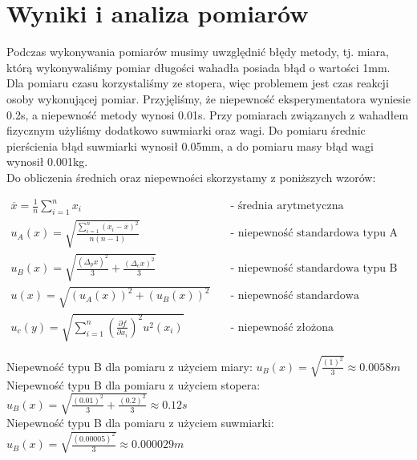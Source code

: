 {\section{Wyniki i analiza pomiarów}}
Podczas wykonywania pomiarów musimy uwzględnić błędy metody,
tj. miara, którą wykonywaliśmy pomiar długości wahadła posiada błąd o wartości 1mm.
Dla pomiaru czasu korzystaliśmy ze stopera, więc problemem jest czas reakcji osoby wykonującej pomiar.
Przyjęliśmy, że niepewność eksperymentatora wyniesie 0.2s, a niepewność metody wynosi 0.01s.
Przy pomiarach związanych z wahadłem fizycznym użyliśmy dodatkowo suwmiarki oraz wagi. Do pomiaru średnic pierścienia błąd suwmiarki wynosił 0.05mm, a do pomiaru masy błąd wagi wynosił 0.001kg. \\
\indent Do obliczenia średnich oraz niepewności skorzystamy z poniższych wzorów: 

\begin{equation*}
    \begin{aligned}
        \displaystyle \overline{x} = \frac{1}{n} \sum_{i=1}^{n} x_i                         \quad &{\textrm{- średnia arytmetyczna}} \\
        u_A(x) = \sqrt{\frac{ \displaystyle \sum_{i=1}^{n}(x_i - \overline{x})^2 }{n(n-1)}} \quad &{\textrm{- niepewność standardowa typu A}} \\
        u_B(x) = \sqrt{ \frac{(\Delta_p x)^2}{3} + \frac{(\Delta_e x)^2}{3} }               \quad &{\textrm{- niepewność standardowa typu B}} \\
        u(x) = \sqrt{ (u_A(x))^2 + (u_B(x))^2 }                                             \quad &{\textrm{- niepewność standardowa całkowita}} \\
        u_c(y) = \sqrt{\displaystyle\sum_{i=1}^{n} \left( \frac{\partial f}{\partial x_i} \right)^2 u^2(x_i)} \quad &{\textrm{- niepewność złożona}}
    \end{aligned}
\end{equation*}

Niepewność typu B dla pomiaru z użyciem miary: $\displaystyle u_B(x) = \sqrt{ \frac{(1)^2}{3} } \approx 0.0058m$ \\

Niepewność typu B dla pomiaru z użyciem stopera: $\displaystyle u_B(x) = \sqrt{ \frac{(0.01)^2}{3} + \frac{(0.2)^2}{3} } \approx 0.12s$ \\

Niepewność typu B dla pomiaru z użyciem suwmiarki: $\displaystyle u_B(x) = \sqrt{ \frac{(0.00005)^2}{3} } \approx 0.000029m$ \\

